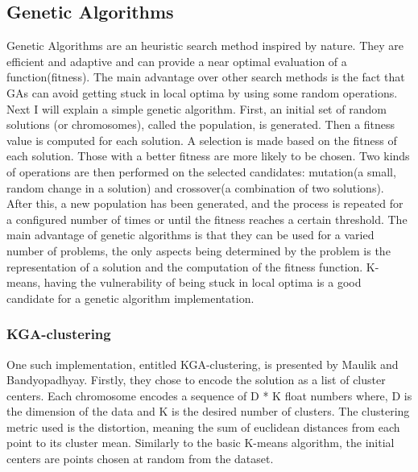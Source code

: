 \documentclass[12pt]{article}
\begin{document}
	\subsection{Genetic Algorithms}
	Genetic Algorithms\cite{ProgrammingCollectiveIntelligence} are an heuristic search method inspired by nature. They are efficient and adaptive and can provide a near optimal evaluation of a function(fitness). The main advantage over other search methods is the fact that GAs can avoid getting stuck in local optima by using some random operations. Next I will explain a simple genetic algorithm. First, an initial set of random solutions (or chromosomes), called the population, is generated. Then a fitness value is computed for each solution. A selection is made based on the fitness of each solution. Those with a better fitness are more likely to be chosen. Two kinds of operations are then performed on the selected candidates: mutation(a small, random change in a solution) and crossover(a combination of two solutions). After this, a new population has been generated, and the process is repeated for a configured number of times or until the fitness reaches a certain threshold. The main advantage of genetic algorithms is that they can be used for a varied number of problems, the only aspects being determined by the problem is the representation of a solution and the computation of the fitness function. K-means, having the vulnerability of being stuck in local optima is a good candidate for a genetic algorithm implementation.
	
	\subsubsection{KGA-clustering}
	One such implementation, entitled KGA-clustering, is presented by Maulik and Bandyopadhyay\cite{EvolutionaryKMeans}. Firstly, they chose to encode the solution as a list of cluster centers. Each chromosome encodes a sequence of D * K float numbers where, D is the dimension of the data and K is the desired number of clusters. The clustering metric used is the distortion, meaning the sum of euclidean distances from each point to its cluster mean. Similarly to the basic K-means algorithm, the initial centers are points chosen at random from the dataset.
	
\end{document}
